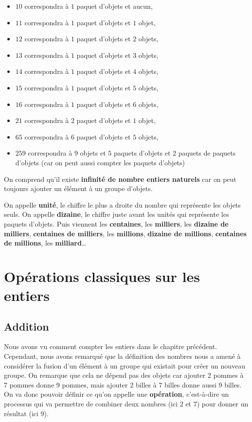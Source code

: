 \begin{itemize}
\item $10$ correspondra à $1$ paquet d'objets et aucun,
\item $11$ correspondra à $1$ paquet d'objets et $1$ objet,
\item $12$ correspondra à $1$ paquet d'objets et $2$ objets,
\item $13$ correspondra à $1$ paquet d'objets et $3$ objets,
\item $14$ correspondra à $1$ paquet d'objets et $4$ objets,
\item $15$ correspondra à $1$ paquet d'objets et $5$ objets,
\item $16$ correspondra à $1$ paquet d'objets et $6$ objets,
\item $21$ correspondra à $2$ paquet d'objets et $1$ objet,
\item $65$ correspondra à $6$ paquet d'objets et $5$ objets,
\item $259$ correspondra à $9$ objets et $5$ paquets d'objets et $2$ paquets de paquets d'objets
(car on peut aussi compter les paquets d'objets)
\end{itemize}

On comprend qu'il existe \textbf{infinité de nombre entiers naturels} car on peut toujours ajouter un élément à un groupe d'objets.

On appelle \textbf{unité}, le chiffre le plus a droite du nombre qui représente les objets seuls. On appelle \textbf{dizaine}, le chiffre juste avant les unités qui représente les paquets d'objets. Puis viennent les \textbf{centaines}, les \textbf{milliers}, les \textbf{dizaine de milliers}, \textbf{centaines de milliers}, les \textbf{millions}, \textbf{dizaine de millions}, \textbf{centaines de millions}, les \textbf{milliard}\dots

\section{Opérations classiques sur les entiers}

\subsection{Addition}
Nous avons vu comment compter les entiers dans le chapitre précédent. Cependant, nous avons remarqué que la définition des nombres nous a amené à considérer la fusion d'un élément à un groupe qui existait pour créer un nouveau groupe. On remarque que cela ne dépend pas des objets car ajouter 2 pommes à 7 pommes donne 9 pommes, mais ajouter 2 billes à 7 billes donne aussi 9 billes. On va donc pouvoir définir ce qu'on appelle une \textbf{opération}, c'est-à-dire un processus qui va permettre de combiner deux nombres (ici 2 et 7) pour donner un résultat (ici 9).


